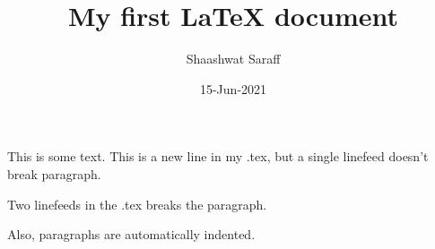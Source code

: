 \documentclass{article}
\author{Shaashwat Saraff}
\title{My first {\LaTeX} document}
\date{15-Jun-2021}
\begin{document}
  \maketitle

  This is some text.
  This is a new line in my .tex, but a single linefeed doesn't break paragraph.

  Two linefeeds in the .tex breaks the paragraph.

  Also, paragraphs are automatically indented. 
\end{document}
